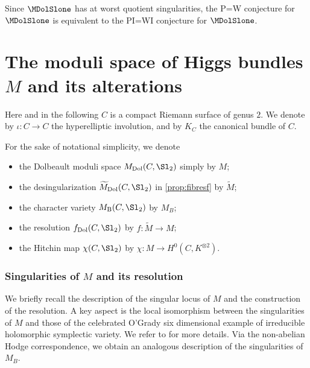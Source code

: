 \begin{rmk}\label{PI=WIisP=Wgenusone}
Since $\MDolSlone$ has at worst quotient singularities, the P=W conjecture for $\MDolSlone$ is equivalent to the PI=WI conjecture for $\MDolSlone$.
\end{rmk}

\section{The moduli space of Higgs bundles \texorpdfstring{$M$}{M} and its alterations}\label{sec:preliminary}
Here and in the following $C$ is a compact Riemann surface of genus $2$. We denote by $\iota\colon C \to C$ the hyperelliptic involution, and by $K_C$ the canonical bundle of $C$.

For the sake of notational simplicity, we denote
\begin{itemize}
\item the Dolbeault moduli space ${M}_{\mathrm{Dol}}(C, \Sl_2)$ simply by $M$;
\item the desingularization $\widetilde{M}_{\mathrm{Dol}}(C, \Sl_2)$ in \cref{prop:fibresf} by $\widetilde{M}$;
\item the character variety ${M}_{\mathrm{B}}(C, \Sl_2)$ by $M_B$;
\item the resolution $f_{\mathrm{Dol}}(C, \Sl_2)$ by $f: \widetilde{M} \to M$;
\item the Hitchin map $\chi(C, \Sl_2)$ by $\chi\colon M \to H^0(C, K^{\otimes 2})$.
\end{itemize}

\subsubsection{Singularities of $M$ and its resolution}\label{sec:singularityresolution}
We briefly recall the description of the singular locus of $M$ and the construction of the resolution. A key aspect is the local isomorphism between the singularities of $M$ and those of the celebrated O'Grady six dimensional example of irreducible holomorphic symplectic variety. We refer to \cite{Felisetti2018} for more details.
Via the non-abelian Hodge correspondence, we obtain an analogous description of the singularities of $M_B$.

